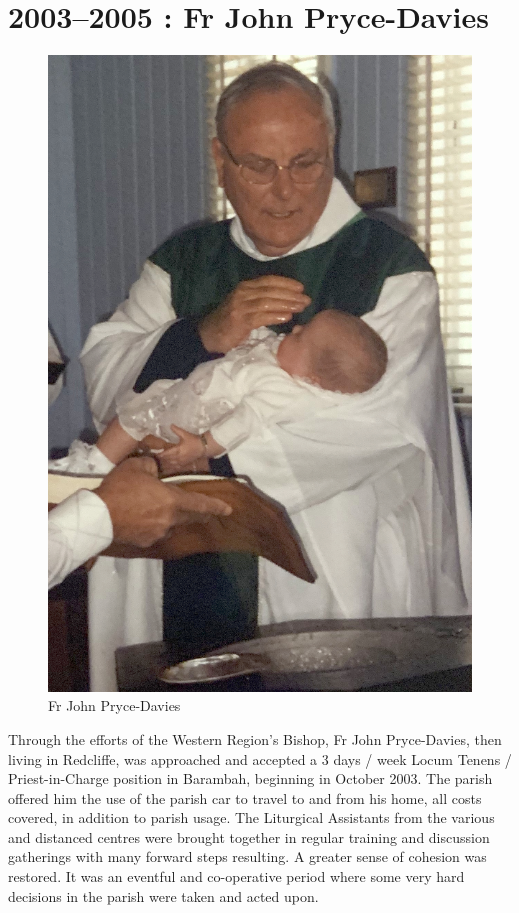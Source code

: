 \section{2003--2005 : Fr John Pryce-Davies}









\begin{figure}
\begin{center}
\includegraphics[width=.7\linewidth,center]{../images/JohnPryceDaviesWessling.jpg}
\caption{Fr John Pryce-Davies}
\end{center}
\end{figure}




Through the efforts of the Western Region's Bishop, Fr John Pryce-Davies, then living in Redcliffe, was approached and accepted a 3 days / week Locum Tenens / Priest-in-Charge position in Barambah, beginning in October 2003. The parish offered him the use of the parish car to travel to and from his home, all costs covered, in addition to parish usage. The Liturgical Assistants from the various and distanced centres were brought together in regular training and discussion gatherings with many forward steps resulting. A greater sense of cohesion was restored. It was an eventful and co-operative period where some very hard decisions in the parish were taken and acted upon.









